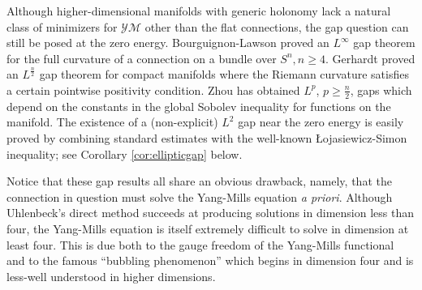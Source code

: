 \documentclass[12pt]{amsart}
\renewcommand{\1}{{\mathbf 1}}
\theoremstyle{others}
\numberwithin{equation}{section}
\begin{document}
Although higher-dimensional manifolds with generic holonomy lack a natural class of minimizers for \(\mathcal{YM}\) other than the flat connections, the gap question can still be posed at the zero energy.
Bourguignon-Lawson \cite{bourguignonlawson} proved an \(L^\infty\) gap theorem for the full curvature of a connection on a bundle over \(S^n, n \geq 4\). Gerhardt \cite{gerhardtgap} proved an \(L^{\frac{n}{2}}\) gap theorem for compact manifolds where the Riemann curvature satisfies a certain pointwise positivity condition. Zhou \cite{zhougap} has obtained \(L^p\), \(p \geq \frac{n}{2}\), gaps which depend on the constants in the global Sobolev inequality for functions on the manifold. The existence of a (non-explicit) $L^2$ gap near the zero energy is easily proved by combining standard estimates with the well-known \L ojasiewicz-Simon inequality; see Corollary \ref{cor:ellipticgap} %
below. %



Notice that these gap results all share an obvious drawback, namely, that the connection in question must solve the Yang-Mills equation {\it a priori}. %
Although Uhlenbeck's direct method succeeds at producing solutions
in dimension less than four, the Yang-Mills equation is itself extremely difficult to solve in dimension at least four. This is due both to the gauge freedom of the Yang-Mills functional and to the famous ``bubbling phenomenon'' which begins in dimension four and is less-well understood in higher dimensions.

\end{document}
